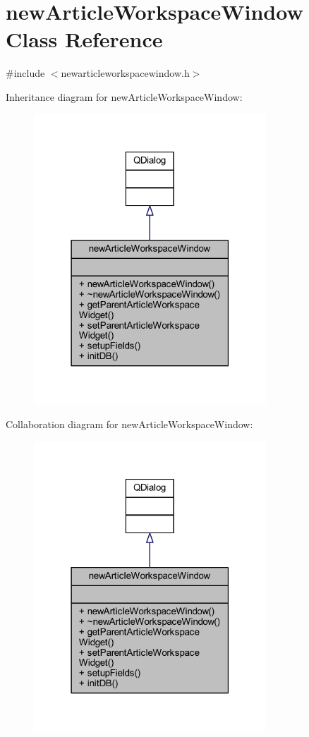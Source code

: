 \hypertarget{classnew_article_workspace_window}{}\section{new\+Article\+Workspace\+Window Class Reference}
\label{classnew_article_workspace_window}


{\ttfamily \#include $<$newarticleworkspacewindow.\+h$>$}



Inheritance diagram for new\+Article\+Workspace\+Window\+:
\nopagebreak
\begin{figure}[H]
\begin{center}
\leavevmode
\includegraphics[width=247pt]{classnew_article_workspace_window__inherit__graph}
\end{center}
\end{figure}


Collaboration diagram for new\+Article\+Workspace\+Window\+:
\nopagebreak
\begin{figure}[H]
\begin{center}
\leavevmode
\includegraphics[width=247pt]{classnew_article_workspace_window__coll__graph}
\end{center}
\end{figure}
